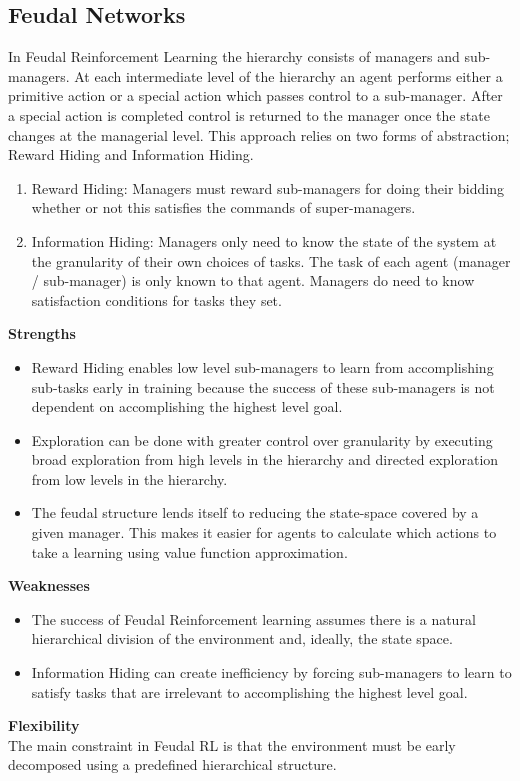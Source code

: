 \subsection{Feudal Networks}

In Feudal Reinforcement Learning the hierarchy consists
of managers and sub-managers. At each intermediate level of the hierarchy an agent performs
either a primitive action or
a special action which passes control to a sub-manager. After a special action
is completed control is
returned to the manager once the state changes at the managerial level. This
approach relies on two
forms of abstraction; Reward Hiding and Information Hiding. \cite{Dayan}

\begin{enumerate}
    \item Reward Hiding: Managers must reward sub-managers for doing their bidding whether or not this
          satisfies the commands of super-managers.
    \item Information Hiding: Managers only need to know the state of the system at the granularity of
          their own choices of tasks. The task of each agent (manager / sub-manager) is only known to that
          agent. Managers do need to know satisfaction conditions for tasks they set.
\end{enumerate}

\textbf{Strengths}
\begin{itemize}
    \item Reward Hiding enables low level sub-managers to learn from accomplishing sub-tasks early in training
          because the success of these sub-managers is not dependent on accomplishing the highest level goal.
    \item Exploration can be done with greater control over granularity by executing broad exploration from high levels
          in the hierarchy and directed exploration from low levels in the hierarchy.
    \item The feudal structure lends itself to reducing the state-space covered by a given manager.
          This makes it easier for agents to calculate which actions to take a learning using value function approximation.
\end{itemize}

\textbf{Weaknesses}
\begin{itemize}
    \item The success of Feudal Reinforcement learning assumes there is a natural hierarchical division of the environment
          and, ideally, the state space.
    \item Information Hiding can create inefficiency by forcing sub-managers to learn to satisfy tasks that are irrelevant to
          accomplishing the highest level goal.
\end{itemize}

\textbf{Flexibility} \\
The main constraint in Feudal RL is that the environment must be early
decomposed using a predefined hierarchical structure.

